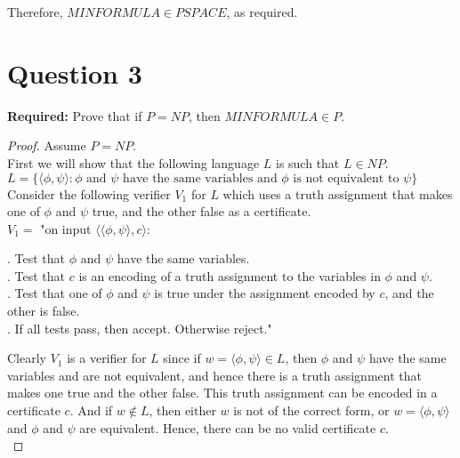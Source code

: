 \documentclass[12pt]{article}
\begin{document}
Therefore, $MINFORMULA \in PSPACE$, as required.  

\newpage

\section*{Question 3}

\textbf{Required:} Prove that if $P = NP$, then $MINFORMULA \in P$. 

\begin{proof}
Assume $P = NP$. \\

First we will show that the following language $L$ is such that $L \in NP$. \\

$L = \{\langle \phi, \psi \rangle : \text{$\phi$ and $\psi$ have the same variables and $\phi$ is not equivalent to $\psi$}\}$ \\

Consider the following verifier $V_1$ for $L$ which uses a truth assignment that makes one of $\phi$ and $\psi$ true, and the other false as a certificate. \\

$V_1 = $ "on input $\langle \langle \phi, \psi \rangle, c \rangle$: \\

\setlength\parindent{15pt}

. Test that $\phi$ and $\psi$ have the same variables. \\

. Test that $c$ is an encoding of a truth assignment to the variables in $\phi$ and $\psi$. \\

. Test that one of $\phi$ and $\psi$ is true under the assignment encoded by $c$, and the other is false. \\

. If all tests pass, then accept. Otherwise reject." \\

\setlength\parindent{0pt}

Clearly $V_1$ is a verifier for $L$ since if $w = \langle \phi, \psi \rangle \in L$, then $\phi$ and $\psi$ have the same variables and are not equivalent, and hence there is a truth assignment that makes one true and the other false. This truth assignment can be encoded in a certificate $c$. And if $w \not \in L$, then either $w$ is not of the correct form, or $w = \langle \phi, \psi \rangle$ and $\phi$ and $\psi$ are equivalent. Hence, there can be no valid certificate $c$. \\


\end{proof}
\end{document}
